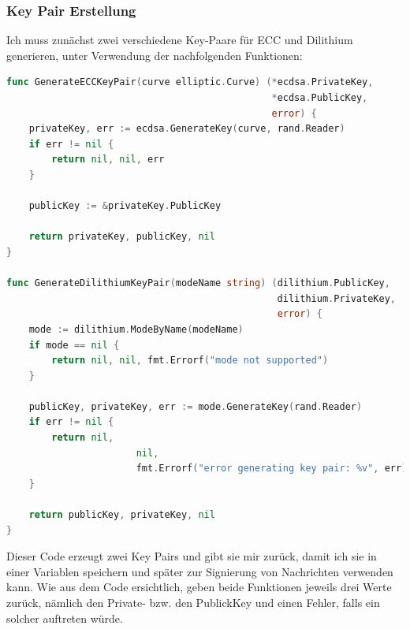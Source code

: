 \subsubsection{Key Pair Erstellung}
Ich muss zunächst zwei verschiedene Key-Paare für ECC und Dilithium generieren, unter Verwendung der nachfolgenden Funktionen:
\begin{lstlisting}[language=Go]
func GenerateECCKeyPair(curve elliptic.Curve) (*ecdsa.PrivateKey,
                                               *ecdsa.PublicKey, 
                                               error) {
	privateKey, err := ecdsa.GenerateKey(curve, rand.Reader)
	if err != nil {
		return nil, nil, err
	}

	publicKey := &privateKey.PublicKey

	return privateKey, publicKey, nil
}

func GenerateDilithiumKeyPair(modeName string) (dilithium.PublicKey,
                                                dilithium.PrivateKey, 
                                                error) {
	mode := dilithium.ModeByName(modeName)
	if mode == nil {
		return nil, nil, fmt.Errorf("mode not supported")
	}

	publicKey, privateKey, err := mode.GenerateKey(rand.Reader)
	if err != nil {
		return nil, 
                       nil,
                       fmt.Errorf("error generating key pair: %v", err)
	}

	return publicKey, privateKey, nil
}
\end{lstlisting}
Dieser Code erzeugt zwei Key Pairs und gibt sie mir zurück, damit ich sie in einer Variablen speichern und später zur Signierung von Nachrichten verwenden kann. Wie aus dem Code ersichtlich, geben beide Funktionen jeweils drei Werte zurück, nämlich den Private- bzw. den PublickKey und einen Fehler, falls ein solcher auftreten würde.
